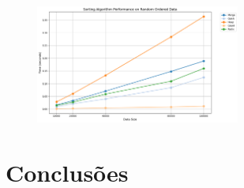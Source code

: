 \begin{figure}[H]
  \centering
  \includegraphics[width=0.6\textwidth]{images/o_random}
\end{figure}

\chapter{Conclusões}
